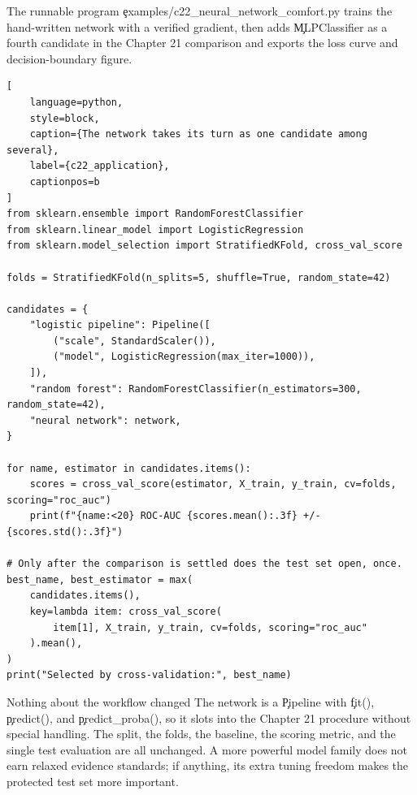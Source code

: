 The runnable program \c{examples/c22_neural_network_comfort.py} trains the
hand-written network with a verified gradient, then adds \c{MLPClassifier} as a
fourth candidate in the Chapter 21 comparison and exports the loss curve and
decision-boundary figure.

\begin{lstlisting}[
    language=python,
    style=block,
    caption={The network takes its turn as one candidate among several},
    label={c22_application},
    captionpos=b
]
from sklearn.ensemble import RandomForestClassifier
from sklearn.linear_model import LogisticRegression
from sklearn.model_selection import StratifiedKFold, cross_val_score

folds = StratifiedKFold(n_splits=5, shuffle=True, random_state=42)

candidates = {
    "logistic pipeline": Pipeline([
        ("scale", StandardScaler()),
        ("model", LogisticRegression(max_iter=1000)),
    ]),
    "random forest": RandomForestClassifier(n_estimators=300, random_state=42),
    "neural network": network,
}

for name, estimator in candidates.items():
    scores = cross_val_score(estimator, X_train, y_train, cv=folds, scoring="roc_auc")
    print(f"{name:<20} ROC-AUC {scores.mean():.3f} +/- {scores.std():.3f}")

# Only after the comparison is settled does the test set open, once.
best_name, best_estimator = max(
    candidates.items(),
    key=lambda item: cross_val_score(
        item[1], X_train, y_train, cv=folds, scoring="roc_auc"
    ).mean(),
)
print("Selected by cross-validation:", best_name)
\end{lstlisting}

\begin{SyntaxBox}{Nothing about the workflow changed}
The network is a \c{Pipeline} with \c{fit()}, \c{predict()}, and
\c{predict_proba()}, so it slots into the Chapter 21 procedure without special
handling. The split, the folds, the baseline, the scoring metric, and the
single test evaluation are all unchanged. A more powerful model family does not
earn relaxed evidence standards; if anything, its extra tuning freedom makes
the protected test set more important.
\end{SyntaxBox}


